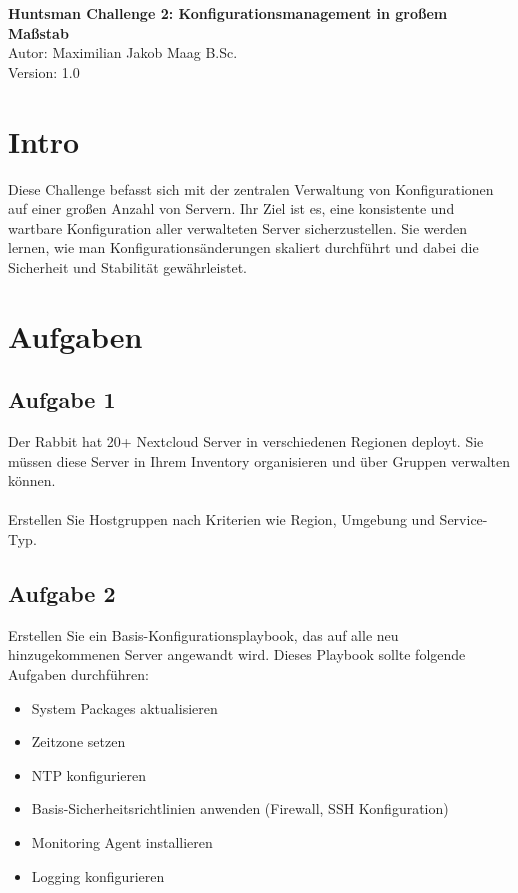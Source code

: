 \documentclass{article}
\begin{document}
    \begin{center}
        \Large \textbf{Huntsman Challenge 2: Konfigurationsmanagement in großem Maßstab} \\ [6pt]
        \normalsize
        Autor: Maximilian Jakob Maag B.Sc. \\
        Version: 1.0
    \end{center}

    \section{Intro}
    Diese Challenge befasst sich mit der zentralen Verwaltung von Konfigurationen auf einer großen Anzahl von Servern.
    Ihr Ziel ist es, eine konsistente und wartbare Konfiguration aller verwalteten Server sicherzustellen.
    Sie werden lernen, wie man Konfigurationsänderungen skaliert durchführt und dabei die Sicherheit und Stabilität gewährleistet.

    \section{Aufgaben}

    \subsection{Aufgabe 1}
    Der Rabbit hat 20+ Nextcloud Server in verschiedenen Regionen deployt.
    Sie müssen diese Server in Ihrem Inventory organisieren und über Gruppen verwalten können.
    \\ \\
    Erstellen Sie Hostgruppen nach Kriterien wie Region, Umgebung und Service-Typ.

    \subsection{Aufgabe 2}
    Erstellen Sie ein Basis-Konfigurationsplaybook, das auf alle neu hinzugekommenen Server angewandt wird.
    Dieses Playbook sollte folgende Aufgaben durchführen:
    \begin{itemize}
        \item System Packages aktualisieren
        \item Zeitzone setzen
        \item NTP konfigurieren
        \item Basis-Sicherheitsrichtlinien anwenden (Firewall, SSH Konfiguration)
        \item Monitoring Agent installieren
        \item Logging konfigurieren
    \end{itemize}
\end{document}
